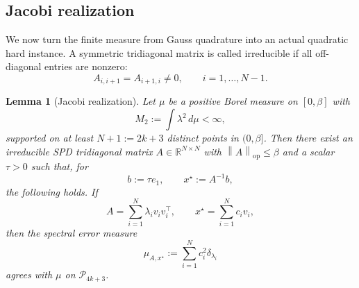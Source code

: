 \documentclass[11pt]{article}
\newtheorem{lemma}[theorem]{Lemma}
\theoremstyle{definition}
\newcommand{\R}{\mathbb{R}}
\newcommand{\Pcal}{\mathcal{P}}
\newcommand{\norm}[1]{\left\lVert #1\right\rVert}
\newcommand{\op}{\mathrm{op}}
\begin{document}
\subsection{Jacobi realization}

We now turn the finite measure from Gauss quadrature into an actual quadratic
hard instance.  A symmetric tridiagonal matrix is called irreducible if all
off-diagonal entries are nonzero:
\[
  A_{i,i+1}=A_{i+1,i}\ne 0,\qquad i=1,\ldots,N-1.
\]

\begin{lemma}[Jacobi realization]
\label{lem:jacobi}
Let \(\mu\) be a positive Borel measure on \([0,\beta]\) with
\[
  M_2:=\int \lambda^2\,d\mu<\infty,
\]
supported on at least \(N+1:=2k+3\) distinct points in \((0,\beta]\).  Then
there exist an irreducible SPD tridiagonal matrix \(A\in\R^{N\times N}\)
with \(\norm{A}_{\op}\le\beta\) and a scalar \(\tau>0\) such that, for
\[
  b:=\tau e_1,
  \qquad x^\star:=A^{-1}b,
\]
the following holds.  If
\[
  A=\sum_{i=1}^N \lambda_i v_i v_i^\top,
  \qquad
  x^\star=\sum_{i=1}^N c_i v_i,
\]
then the spectral error measure
\[
  \mu_{A,x^\star}:=\sum_{i=1}^N c_i^2\delta_{\lambda_i}
\]
agrees with \(\mu\) on \(\Pcal_{4k+3}\).
\end{lemma}
\end{document}
